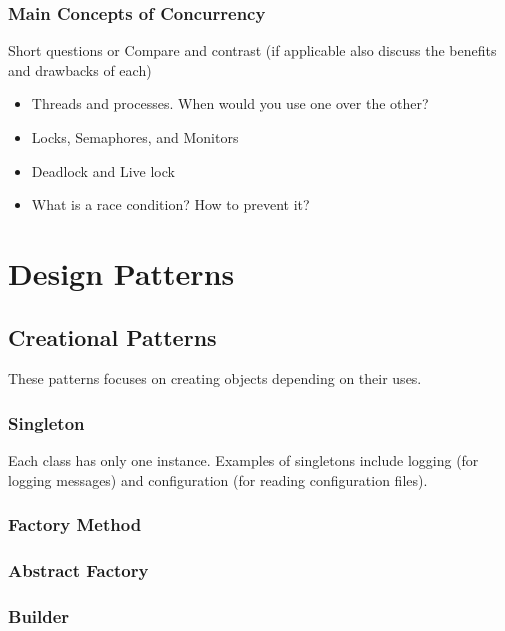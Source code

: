 \documentclass[oneside,11pt,dvipsnames]{book}
\begin{document}
\subsection{Main Concepts of Concurrency}\label{sec:concurrency-concepts}

Short questions or Compare and contrast (if applicable also discuss the benefits and drawbacks of each) 
\begin{itemize}
    \item Threads and processes. When would you use one over the other?
    \item Locks, Semaphores, and Monitors
    \item Deadlock and Live lock
    \item What is a race condition? How to prevent it?
\end{itemize}


\chapter{Design Patterns}

\section{Creational Patterns}
These patterns focuses on creating objects depending on their uses. 

\subsection{Singleton}
Each class has only one instance. Examples of singletons include logging (for logging messages) and configuration (for reading configuration files). 



\subsection{Factory Method}





\subsection{Abstract Factory}

\subsection{Builder}
\end{document}
